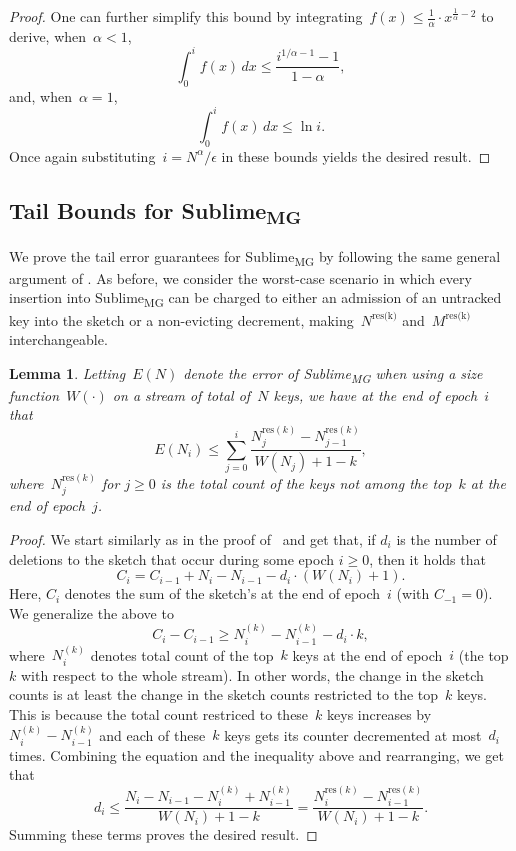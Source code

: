\documentclass[sigconf]{acmart}
\newtheorem{lemma}[theorem]{Lemma}
\newcommand{\sketch}{Sublime}
\newcommand{\sketchmg}{\sketch\textsubscript{MG}\xspace}
\begin{document}
\begin{proof}
    One can further simplify this bound by integrating~$f(x) \leq \frac1\alpha \cdot x^{\frac1\alpha-2}$ to derive, when~$\alpha < 1$,
    $$ \int_0^i f(x) \, dx \leq \frac{i^{1/\alpha-1}-1}{1-\alpha}, $$
    and, when~$\alpha=1$,
    $$ \int_0^i f(x) \, dx \leq \ln i. $$
    Once again substituting~$i=N^\alpha/\epsilon$ in these bounds yields the desired result.
\end{proof}


\subsection{Tail Bounds for \sketchmg}\label{apx:upper_bounds_mg_res}
We prove the tail error guarantees for \sketchmg by following the same general argument of .
As before, we consider the worst-case scenario in which every insertion into \sketchmg can be charged to either an admission of an untracked key into the sketch or a non-evicting decrement, making~$N^{\text{res(k)}}$ and~$M^{\text{res(k)}}$ interchangeable.

\begin{lemma}\label{lemma:mg-res-w}
    Letting~$E(N)$ denote the error of \sketchmg when using a size
    function~$W(\cdot)$ on a stream of total of~$N$ keys, we have at the end of
    epoch~$i$ that
    $$ E(N_i) \leq \sum_{j=0}^i \frac{N^{\text{res}(k)}_j-N^{\text{res}(k)}_{j-1}}{W(N_j)+1-k}, $$
    where~$N^{\text{res}(k)}_j$ for $j\geq 0$ is the total count of the keys
    not among the top~$k$ at the end of epoch~$j$.
\end{lemma}
\begin{proof}
    We start similarly as in the proof of~ and get that, if
    $d_i$ is the number of deletions to the sketch that occur during some epoch
    $i \geq 0$, then it holds that
    $$ C_i = C_{i-1} + N_i - N_{i-1} - d_i \cdot (W(N_i)+1). $$
    Here, $C_i$ denotes the sum of the sketch's at the end of epoch~$i$ (with
    $C_{-1}=0$). We generalize the above to
    $$ C_i - C_{i-1} \geq  N^{(k)}_i - N^{(k)}_{i-1} - d_i \cdot k,$$
    where~$N^{(k)}_i $ denotes total count of the top~$k$ keys at the end of
    epoch~$i$ (the top $k$ with respect to the whole stream). In other words,
    the change in the sketch counts is at least the change in the sketch counts
    restricted to the top~$k$ keys. This is because the total count restriced
    to these~$k$ keys increases by~$N^{(k)}_i - N^{(k)}_{i-1}$ and each of
    these~$k$ keys gets its counter decremented at most~$d_i$ times.
    Combining the equation and the inequality above and rearranging, we get
    that
    $$ d_i \leq \frac{N_i - N_{i-1} -N^{(k)}_i + N^{(k)}_{i-1}}{W(N_i)+1-k} =  \frac{N^{\text{res}(k)}_i- N^{\text{res}(k)}_{i-1}}{W(N_i)+1-k}. $$
    Summing these terms proves the desired result.
\end{proof}
\end{document}
